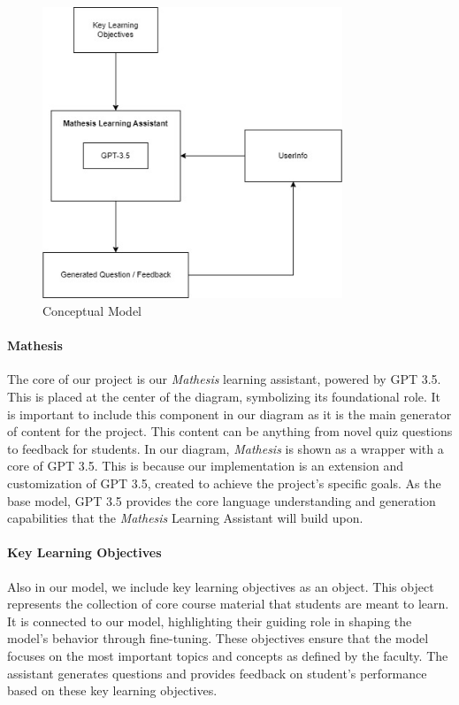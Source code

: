 \documentclass[12pt,a4paper]{article}
\begin{document}
    \begin{figure}[H]
        \centering
        \includegraphics[width=0.8\textwidth]{Conceptual_diagram}
        \caption{Conceptual Model}
        \label{fig:conceptualModel}
    \end{figure}
    

    \paragraph{Mathesis}
    The core of our project is our \textit{Mathesis}
    learning assistant, powered by GPT 3.5.  This is placed at the center of the diagram, symbolizing
    its foundational role. It is important to include this component in our diagram as it is the main
    generator of content for the project.  This content can be anything from novel quiz questions to
    feedback for students. In our diagram, \textit{Mathesis} is shown as a wrapper with a core of
    GPT 3.5.  This is because our implementation is an extension and customization of GPT 3.5, created
    to achieve the project's specific goals. As the base model, GPT 3.5 provides the core language
    understanding and generation capabilities that the \textit{Mathesis} Learning Assistant will build
    upon.

    \paragraph{Key Learning Objectives}
    Also in our model, we include key learning objectives as an object.  This object represents the
    collection of core course material that students are meant to learn.  It is connected to our model,
    highlighting their guiding role in shaping the model's behavior through fine-tuning. These
    objectives ensure that the model focuses on the most important topics and concepts as defined by
    the faculty. The assistant generates questions and provides feedback on student's performance
    based on these key learning objectives.
\end{document}
